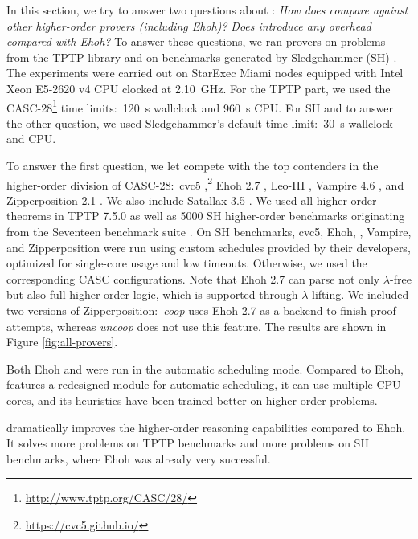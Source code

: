 In this section, we try to answer two questions about \ehohii{}: \emph{How does
\ehohii{} compare against other higher-order provers (including Ehoh)?} \emph{Does
\ehohii{} introduce any overhead compared with Ehoh?} To answer
these questions, we ran provers on problems from the TPTP library \cite{gs-17-tptp} and on
benchmarks generated by Sledgehammer (SH) \cite{pb-12-sh}.
The experiments were carried out on StarExec Miami
\cite{sst-14-starexec} nodes equipped with Intel Xeon E5-2620 v4 CPU clocked at
2.10~GHz. For the TPTP part, we used the CASC-28\footnote{\url{http://www.tptp.org/CASC/28/}} time limits:\ 120~s
wallclock and 960~s CPU. For SH and to answer the other question, we used Sledgehammer's
default time limit:\ 30~s wallclock and CPU.

To answer the first question, we let
\ehohii{} compete with the top contenders in the higher-order division of
CASC-28:\ cvc5 ,\footnote{\url{https://cvc5.github.io/}}
Ehoh 2.7
\cite{section-ehoh}, Leo-III  \cite{sb-21-leo3}, Vampire 4.6
\cite{br-20-full-sup-w-combs}, and Zipperposition 2.1
\cite{section-making-ho-work}. We also include Satallax 3.5
\cite{cb-12-satallax}. We used all  higher-order
theorems in TPTP 7.5.0 as well as 5000 SH higher-order benchmarks
originating from the Seventeen benchmark suite \cite{desharnais-et-al-202x}.
On SH benchmarks,
cvc5, Ehoh, \ehohii{}, Vampire, and Zipperposition were run using custom schedules provided by
their developers, optimized for single-core usage and low timeouts.
Otherwise, we used the corresponding CASC configurations.
Note that Ehoh 2.7 can parse not only $\lambda$-free but also full higher-order logic,
which is supported through $\lambda$-lifting.
We included two versions of Zipperposition:\ \emph{coop} uses Ehoh 2.7 as a backend to finish proof attempts,
whereas \emph{uncoop} does not use this feature. The results
are shown in Figure \ref{fig:all-provers}.

Both Ehoh and \ehohii{} were run in the automatic scheduling mode. Compared to Ehoh,
\ehohii{} features a redesigned module for automatic scheduling, it
can use multiple CPU cores, and its heuristics have been trained better on higher-order problems.

\ehohii{} dramatically improves the higher-order reasoning capabilities
compared to Ehoh. It solves  more problems on TPTP benchmarks
and  more problems on SH benchmarks, where Ehoh was already very
successful.

